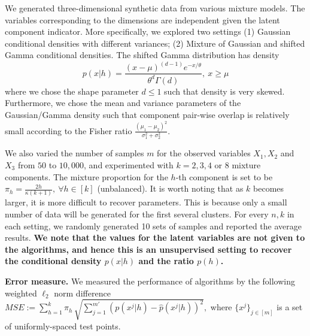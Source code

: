\documentclass{article}
\begin{document}
We generated three-dimensional synthetic data from various mixture models. The variables corresponding to the dimensions are independent given the latent component indicator. More specifically, we explored two settings (1) Gaussian conditional densities with different variances; (2) Mixture of Gaussian and shifted Gamma conditional densities.
%
%
The shifted Gamma distribution has density
$$p(x|h)=\frac{(x-\mu)^{(d-1)}e^{-x/\theta}}{\theta^d \Gamma(d)},~x\geq \mu$$
where we chose the shape parameter $d\le 1$ such that density is very skewed. Furthermore, we chose the mean and variance parameters of the Gaussian/Gamma density such that component pair-wise overlap is relatively small according to the Fisher ratio $\frac{(\mu_1 - \mu_2)^2}{\sigma_1^2+\sigma_2^2}$.

We also varied the number of samples $m$ for the observed variables $X_1,X_2$ and $X_3$ from $50$ to $10,000$, and
experimented with $k=2,3,4$ or $8$ mixture components. The mixture proportion for the $h$-th component is set to be $\pi_h= \frac{2h}{\kappa(k+1)},~\forall h\in[k]$ (unbalanced). It is worth noting that as $k$ becomes larger, it is more difficult to recover parameters. This is because only a small number of data will be generated for the first several clusters. For every $n,k$ in each setting, we randomly generated 10 sets of samples and reported the average results. {\bf We note that the values for the latent variables are not given to the algorithms, and hence this is an unsupervised setting to recover the conditional density $p(x|h)$ and the ratio $p(h)$.}

{\bf Error measure.} We measured the performance of algorithms by the
following weighted $\ell_2$ norm difference
$
  MSE:=\sum_{h=1}^{k} \pi_h\, \sqrt{\sum_{j=1}^{m'} (p(x^j|h) - \widehat{p}(x^j|h))^2 },
$
where $\{x^j\}_{j\in[m]}$ is a set of uniformly-spaced test points.
%
%
%
\end{document}
